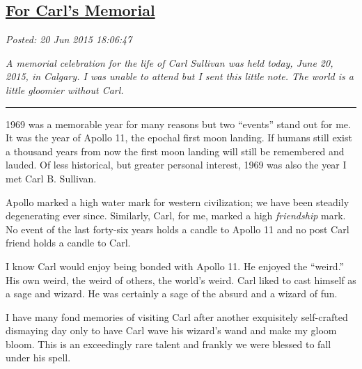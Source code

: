 %

\subsection*{\href{https://bakerjd99.wordpress.com/2015/06/20/for-carls-memorial/}{For Carl's Memorial}}


\noindent\emph{Posted: 20 Jun 2015 18:06:47}
\vspace{6pt}



\captionsetup[figure]{labelformat=empty}


\emph{A memorial celebration for the life of Carl Sullivan was held
today, June 20, 2015, in Calgary. I was unable to attend but I sent
this little note. The world is a little gloomier without Carl.}

\begin{center}\rule{3in}{0.4pt}\end{center}


1969 was a memorable year for many reasons but two ``events'' stand out
for me. It was the year of Apollo 11, the epochal first moon landing. If
humans still exist a thousand years from now the first moon landing will
still be remembered and lauded. Of less historical, but greater personal
interest, 1969 was also the year I met Carl B. Sullivan.

Apollo marked a high water mark for western civilization; we have been
steadily degenerating ever since. Similarly, Carl, for me, marked a high
\emph{friendship} mark. No event of the last forty-six years holds a
candle to Apollo 11 and no post Carl friend holds a candle to Carl.

I know Carl would enjoy being bonded with Apollo 11. He enjoyed the
``weird.'' His own weird, the weird of others, the world's weird. Carl
liked to cast himself as a sage and wizard. He was certainly a sage of
the absurd and a wizard of fun.

I have many fond memories of visiting Carl after another exquisitely
self-crafted dismaying day only to have Carl wave his wizard's wand and
make my gloom bloom. This is an exceedingly rare talent and frankly we
were blessed to fall under his spell.

